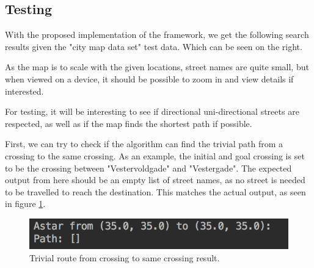\subsection{Testing}

\begin{multicols}{2}


With the proposed implementation of the framework, we get the following search results given the "city map data set" test data. Which can be seen on the right. 

As the map is to scale with the given locations, street names are quite small, but when viewed on a device, it should be possible to zoom in and view details if interested.

For testing, it will be interesting to see if directional uni-directional streets are respected, as well as if the map finds the shortest path if possible.

First, we can try to check if the algorithm can find the trivial path from a crossing to the same crossing. As an example, the initial and goal crossing is set to be the crossing between "Vestervoldgade" and "Vestergade". The expected output from here should be an empty list of street names, as no street is needed to be travelled to reach the destination. This matches the actual output, as seen in figure \ref{fig:test1}.

\begin{figure}[H]
    \centering
    \includegraphics[width = 0.9\linewidth]{RouteFinding/RFtest1.png}
    \caption{Trivial route from crossing to same crossing result.}
    \label{fig:test1}
\end{figure}



\end{multicols}
